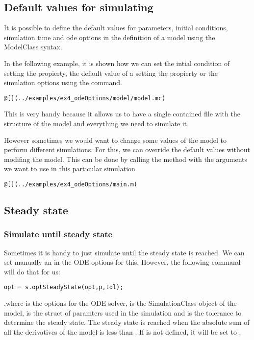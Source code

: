 \documentclass[11pt]{article}
\begin{document}
\subsection{Default values for simulating}

It is possible to define the default values for parameters, initial conditions, simulation time and ode options in the definition of a model using the ModelClass syntax.

In the following example, it is shown how we can set the intial condition of  setting the  propierty, the default value of a  setting the  propierty or the simulation options using the  command.

\begin{lstlisting}
@[](../examples/ex4_odeOptions/model/model.mc)
\end{lstlisting}

This is very handy because it allows us to have a single contained file with the structure of the model and everything we need to simulate it.

However sometimes we would want to change some values of the model to perform different simulations.
For this, we can override the default values without modifing the model. This can be done by calling the  method with the arguments we want to use in this particular simulation.

\begin{lstlisting}
@[](../examples/ex4_odeOptions/main.m)
\end{lstlisting}

\subsection{Steady state}

\subsubsection{Simulate until steady state}

Sometimes it is handy to just simulate until the steady state is reached. We can set manually an  in the ODE options for this. However, the following command will do that for us:

\begin{lstlisting}
opt = s.optSteadyState(opt,p,tol);
\end{lstlisting}

,where  is the options for the ODE solver,  is the SimulationClass object of the model,  is the struct of paramters used in the simulation and  is the tolerance to determine the steady state. The steady state is reached when the absolute sum of all the derivatives of the model is less than . If  is not defined, it will be set to .
\end{document}
